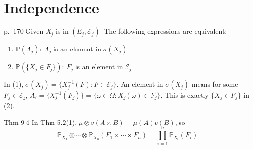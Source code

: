 \setcounter{section}{8}
\section{Independence}

\begin{note}{p.~170}
    Given $X_j$ is in $(E_j,\mathcal{E}_j)$. The following expressions are equivalent:
    \begin{enumerate}
        \item $\mathbb{P}(A_j)$: $A_j$ is an element in $\sigma(X_j)$
        \item $\mathbb{P}(\{X_j\in F_j\})$: $F_j$ is an element in $\mathcal{E}_j$
    \end{enumerate}
    In (1), $\sigma(X_j)=\{X_j^{-1}(F):F\in\mathcal{E}_j\}$. An element in $\sigma(X_j)$ means for some $F_j\in\mathcal{E}_j$, $A_i=\{X_j^{-1}(F_j)\}=\{\omega\in\Omega:X_j(\omega)\in F_j\}$. This is exactly $\{X_j\in F_j\}$ in (2).
\end{note}

\begin{note}{Thm 9.4}
    In Thm 5.2(1), $\mu\otimes v(A\times B)=\mu(A)v(B)$, so 
    \[
    \mathbb{P}_{X_{1}} \otimes \cdots \otimes \mathbb{P}_{X_{n}}\left(F_{1} \times \cdots \times F_{n}\right)=\prod_{i=1}^{n} \mathbb{P}_{X_{i}}\left(F_{i}\right)
    \]
\end{note}